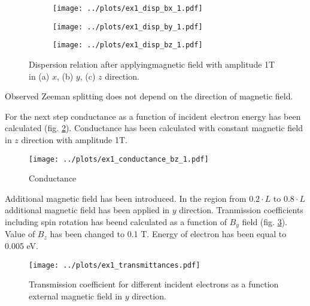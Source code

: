 \documentclass[a4paper, 12pt]{article}
\begin{document}
\begin{figure}[h]
    \begin{center}
        \begin{subfigure}{0.30\textwidth}
            \texttt{[image: ../plots/ex1\_disp\_bx\_1.pdf]}
            \caption{}
        \end{subfigure}
        \begin{subfigure}{0.30\textwidth}
            \texttt{[image: ../plots/ex1\_disp\_by\_1.pdf]}
            \caption{}
        \end{subfigure}
        \begin{subfigure}{0.30\textwidth}
            \texttt{[image: ../plots/ex1\_disp\_bz\_1.pdf]}
            \caption{}
        \end{subfigure}
    \end{center}
    \caption{Dispersion relation after applyingmagnetic field with amplitude 1T in (a) $x$, (b) $y$, (c) $z$ direction.}
    \label{fig:ex1_disp_magn}
\end{figure}

Observed Zeeman splitting does not depend on the direction of magnetic field.

For the next step conductance as a function of incident electron energy has been calculated (fig. \ref{fig:ex1_cond}).
Conductance has been calculated with constant magnetic field in $z$ direction with amplitude 1T.

\begin{figure}[h]
    \begin{center}
        \texttt{[image: ../plots/ex1\_conductance\_bz\_1.pdf]}
    \end{center}
    \caption{Conductance}
    \label{fig:ex1_cond}
\end{figure}

\newpage 
Additional magnetic field has been introduced.
In the region from $0.2 \cdot L$ to $0.8 \cdot L$ additional magnetic field has been applied in $y$ direction.
Tranmission coefficients including spin rotation has beend calculated as a function of $B_y$ field (fig. \ref{fig:ex1_trans}).
Value of $B_z$ has been changed to 0.1 T.
Energy of electron has been equal to 0.005 eV.

\begin{figure}[h]
    \begin{center}
        \texttt{[image: ../plots/ex1\_transmittances.pdf]}
    \end{center}
    \caption{Transmission coefficient for different incident electrons as a function external magnetic field in $y$ direction.}
    \label{fig:ex1_trans}
\end{figure}
\end{document}
